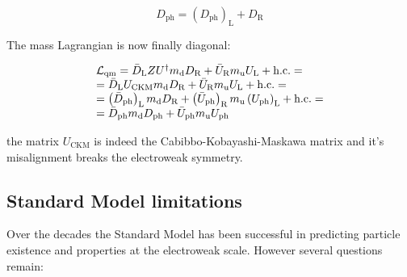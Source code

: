 \begin{equation}
D_{\text{ph}} = \left(D_{\text{ph}}\right)_{\text{L}} + D_{\text{R}}
\end{equation}

The mass Lagrangian is now finally diagonal:

\begin{equation}
\begin{array}{l c l}
\mathcal{L}_{\text{qm}} = \bar{D}_{\text{L}}ZU^{\dagger}m_{\text{d}}D_{\text{R}} + \bar{U}_{\text{R}}m_{\text{u}}U_{\text{L}} + \text{h.c.} = \\
= \bar{D}_{\text{L}}U_{\text{CKM}}m_{\text{d}}D_{\text{R}} + \bar{U}_{\text{R}}m_{\text{u}}U_{\text{L}} + \text{h.c.} = \\
=  \left(\bar{D}_{\text{ph}}\right)_{\text{L}}m_{\text{d}}D_{\text{R}} + \left(\bar{U}_{\text{ph}}\right)_{\text{R}}m_{\text{u}}\left(U_{\text{ph}}\right)_{\text{L}} + \text{h.c.} = \\
= \bar{D}_{\text{ph}}m_{\text{d}}D_{\text{ph}} + \bar{U}_{\text{ph}}m_{\text{u}}U_{\text{ph}}
\label{eq::Lqm_Uckm_diagonal}
\end{array}
\end{equation}

the matrix $U_{\text{CKM}}$ is indeed the Cabibbo-Kobayashi-Maskawa matrix and it's misalignment breaks the electroweak symmetry.

\subsection{Standard Model limitations}

Over the decades the Standard Model has been successful in predicting particle existence and properties at the electroweak scale. However several questions remain:

